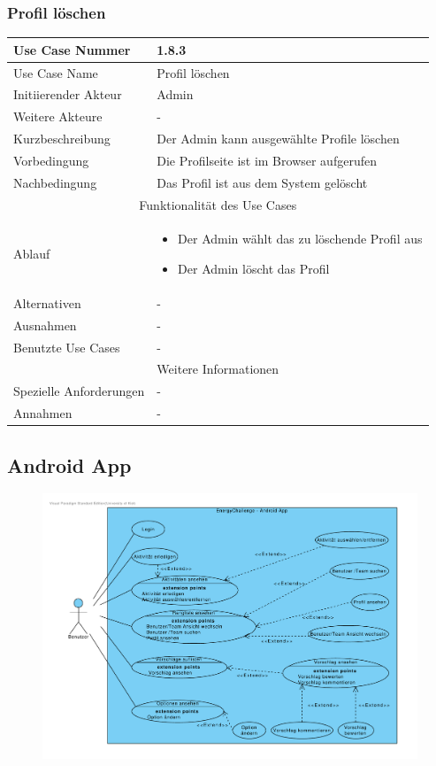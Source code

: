 \documentclass[10pt,a4paper]{article}
\begin{document}
			\subsubsection{Profil l\"oschen}
		\begin{tabular}{|l|p{.5\linewidth}|}
		\hline Use Case Nummer & 1.8.3 \\ 
		\hline Use Case Name & Profil l\"oschen \\ 
		\hline Initiierender Akteur & Admin \\
		\hline Weitere Akteure & - \\
		\hline Kurzbeschreibung & Der Admin kann ausgew\"ahlte Profile l\"oschen \\
		\hline Vorbedingung & Die Profilseite ist im Browser aufgerufen \\
		\hline Nachbedingung & Das Profil ist aus dem System gel\"oscht \\
		\hline \multicolumn{2}{|c|}{Funktionalität des Use Cases}\\
		\hline  Ablauf & \begin{itemize}
					\item Der Admin w\"ahlt das zu löschende Profil aus
					\item Der Admin l\"oscht das Profil
				\end{itemize}\\
		\hline Alternativen & - \\
		\hline Ausnahmen & - \\
		\hline Benutzte Use Cases & - \\
		\hline \multicolumn{2}{|c|}{Weitere Informationen} \\
		\hline Spezielle Anforderungen & - \\
		\hline Annahmen & - \\
		\hline
		\end{tabular}

\subsection{Android App}
	\begin{figure}[h!]
	\includegraphics[width=\linewidth]{gfx/androidapp/overview.pdf}
	\end{figure}
\end{document}
